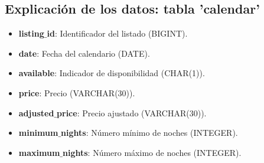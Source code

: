 \subsection*{Explicación de los datos: tabla 'calendar'}
\begin{itemize}[topsep=0pt, partopsep=0pt, itemsep=0pt, parsep=0pt]
\item \textbf{listing$\_$id}: Identificador del listado (BIGINT).
\item \textbf{date}: Fecha del calendario (DATE).
\item \textbf{available}: Indicador de disponibilidad (CHAR(1)).
\item \textbf{price}: Precio (VARCHAR(30)).
\item \textbf{adjusted$\_$price}: Precio ajustado (VARCHAR(30)).
\item \textbf{minimum$\_$nights}: Número mínimo de noches (INTEGER).
\item \textbf{maximum$\_$nights}: Número máximo de noches (INTEGER).
\end{itemize}

\newpage
